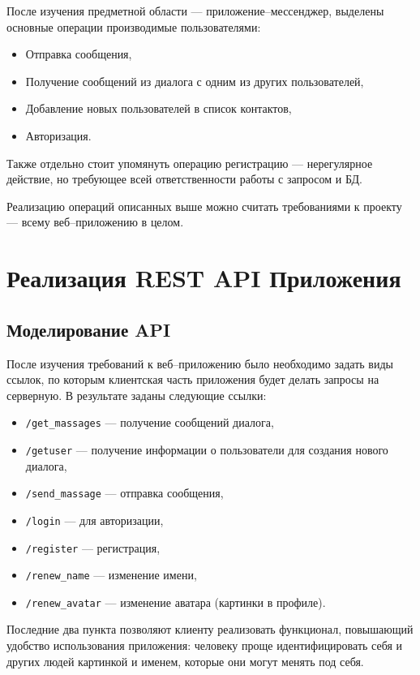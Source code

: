 \documentclass[14pt,final]{report}
\begin{document}
После изучения предметной области --- приложение--мессенджер, выделены основные операции производимые пользователями:
\begin{itemize}
    \item Отправка сообщения,
    \item Получение сообщений из диалога с одним из других пользователей,
    \item Добавление новых пользователей в список контактов,
    \item Авторизация.
\end{itemize}
Также отдельно стоит упомянуть операцию регистрацию --- нерегулярное действие, но требующее всей ответственности работы с запросом и БД.

Реализацию операций описанных выше можно считать требованиями к проекту --- всему веб--приложению в целом.


\chapter{Реализация REST API Приложения}

\section{Моделирование API}

После изучения требований к веб--приложению было необходимо задать виды ссылок, по которым клиентская часть приложения будет делать запросы на серверную. В результате заданы следующие ссылки:
\begin{itemize}
    \item \texttt{/get_massages} --- получение сообщений диалога,
    \item \texttt{/getuser} --- получение информации о пользователи для создания нового диалога,
    \item \texttt{/send_massage} --- отправка сообщения,
    \item \texttt{/login} --- для авторизации,
    \item \texttt{/register} --- регистрация,
    \item \texttt{/renew_name} --- изменение имени,
    \item \texttt{/renew_avatar} --- изменение аватара (картинки в профиле).
\end{itemize}
Последние два пункта позволяют клиенту реализовать функционал, повышающий удобство использования приложения: человеку проще идентифицировать себя и других людей картинкой и именем, которые они могут менять под себя.
\end{document}
